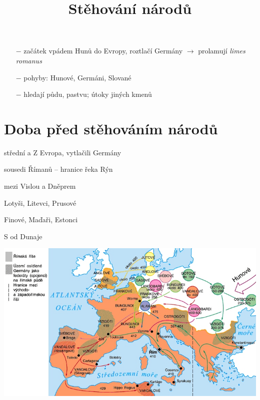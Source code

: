 \documentclass{article}
\title{\vspace{-2cm}Stěhování národů\vspace{-1.7cm}}
\date{}
\begin{document}
\maketitle
\begin{itemize}
    \setlength\itemsep{0.15em}
    \item[$-$] začátek vpádem Hunů do Evropy, roztlačí Germány $\rightarrow$ prolamují \textit{limes romanus}
    \item[$-$] pohyby: Hunové, Germáni, Slované
    \item[$-$] hledají půdu, pastvu; útoky jiných kmenů
\end{itemize}

\section*{Doba před stěhováním národů}
\begin{minipage}{0.5\textwidth}\raggedleft
    \begin{description}
        \setlength\itemsep{0.15em}
        \item[Keltové:] střední a Z Evropa, vytlačili Germány
        \item[Germáni:] sousedi Římanů -- hranice řeka Rýn
        \item[Slované:] mezi Vislou a Dněprem
        \item[Baltové:] Lotyši, Litevci, Prusové
        \item[Ugrofinové:] Finové, Maďaři, Estonci
        \item[Dákové:] S od Dunaje
    \end{description}
\end{minipage}
\hfill
\noindent\begin{minipage}{0.5\textwidth}
    \includegraphics[width=\linewidth]{mapa.jpg}
\end{minipage}
\end{document}
